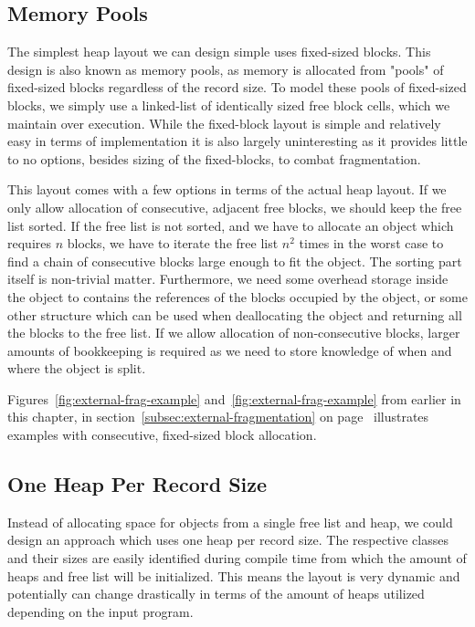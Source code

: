 \subsection{Memory Pools}
\label{subsec:memory-pools}
The simplest heap layout we can design simple uses fixed-sized blocks. This design is also known as memory pools, as memory is allocated from "pools" of fixed-sized blocks regardless of the record size.
To model these pools of fixed-sized blocks, we simply use a linked-list of identically sized free block cells, which we maintain over execution.
While the fixed-block layout is simple and relatively easy in terms of implementation it is also largely uninteresting as it provides little to no options, besides sizing of the fixed-blocks, to combat fragmentation.

This layout comes with a few options in terms of the actual heap layout. If we only allow allocation of consecutive, adjacent free blocks, we should keep the free list sorted. If the free list is not sorted, and we have to allocate an object which requires $n$ blocks, we have to iterate the free list $n^2$ times in the worst case to find a chain of consecutive blocks large enough to fit the object. The sorting part itself is non-trivial matter. Furthermore, we need some overhead storage inside the object to contains the references of the blocks occupied by the object, or some other structure which can be used when deallocating the object and returning all the blocks to the free list. If we allow allocation of non-consecutive blocks, larger amounts of bookkeeping is required as we need to store knowledge of when and where the object is split.

Figures~\ref{fig:external-frag-example} and~\ref{fig:external-frag-example} from earlier in this chapter, in section~\ref{subsec:external-fragmentation} on page~\pageref{fig:external-frag-example} illustrates examples with consecutive, fixed-sized block allocation. 


\subsection{One Heap Per Record Size}
\label{subsec:one-heap-per-record-size}
Instead of allocating space for objects from a single free list and heap, we could design an approach which uses one heap per record size. The respective classes and their sizes are easily identified during compile time from which the amount of heaps and free list will be initialized. This means the layout is very dynamic and potentially can change drastically in terms of the amount of heaps utilized depending on the input program. 

